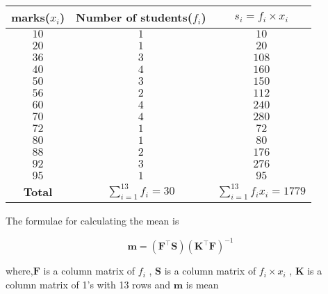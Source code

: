 \documentclass[journal,12pt,twocolumn]{IEEEtran}
\let\vec\mathbf
\providecommand{\brak}[1]{\ensuremath{\left(#1\right)}}
\begin{document}
       \begin{table}[!ht]
            \centering
            \resizebox{\columnwidth}{!}
            {
                \begin{tabular}{|c| c| c| }
                \hline
                 marks($x_{i}$) & Number of students($f_{i}$) & $ s_{i} = f_{i}\times x_{i}$ \\
                 \hline
                 $10$   & $1$ & $10$ \\
                 $20$   & $1$ & $20$ \\
                 $36$   & $3$ & $108$ \\
                 $40$   & $4$ & $160$ \\
                 $50$   & $3$ & $150$ \\
                 $56$   & $2$ & $112$ \\
                 $60$   & $4$ & $240$ \\
                 $70$   & $4$ & $280$ \\
                 $72$   & $1$ & $72$ \\
                 $80$   & $1$ & $80$ \\
                 $88$   & $2$ & $176$ \\
                 $92$   & $3$ & $276$ \\
                 $95$   & $1$ & $95$ \\
                 \hline
                    \textbf{Total} & $\sum_{i=1}^{13} f_{i} = 30$ & $\sum_{i=1}^{13} f_{i}x_{i} = 1779$ \\
                 \hline
                \end{tabular}
            }
            \caption{}
            \label{table:table2}
       \end{table}
       
       
    The formulae for calculating the mean is 
    
    \begin{equation}
       \label{eq:formulae}
       \vec{m} = \brak{\vec{F^{\top}}\vec{S}}\brak{\vec{K^{\top}}\vec{F}}^{-1}
    \end{equation}
    
    where,$\vec{F}$ is a column matrix of $f_{i}$ , $\vec{S}$ is a column matrix of $f_{i}\times x_{i}$ , $\vec{K}$ is a column matrix of 1's with 13 rows and $\vec{m}$ is mean 
    
\end{document}
